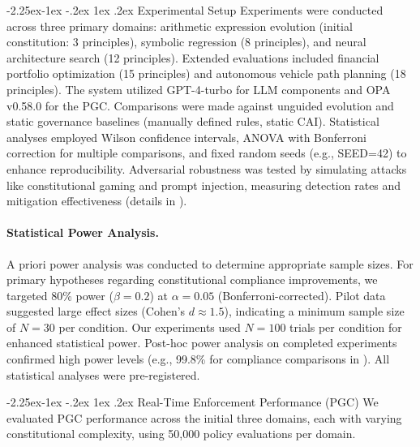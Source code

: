 \documentclass[manuscript,screen,review,anonymous,9pt]{acmart}
\makeatletter
\renewcommand\subsection{\@startsection{subsection}{2}{\z@}%
  {-2.25ex\@plus -1ex \@minus -.2ex}%
  {1ex \@plus .2ex}%
  {\normalfont\large\bfseries}}
\makeatother
\begin{document}
\subsection{Experimental Setup}
\label{subsec:experimental_setup}
Experiments were conducted across three primary domains: arithmetic expression evolution (initial constitution: 3 principles), symbolic regression (8 principles), and neural architecture search (12 principles). Extended evaluations included financial portfolio optimization (15 principles) and autonomous vehicle path planning (18 principles). The system utilized GPT-4-turbo for LLM components and OPA v0.58.0 for the PGC. Comparisons were made against unguided evolution and static governance baselines (manually defined rules, static CAI). Statistical analyses employed Wilson confidence intervals, ANOVA with Bonferroni correction for multiple comparisons, and fixed random seeds (e.g., SEED=42) to enhance reproducibility. Adversarial robustness was tested by simulating attacks like constitutional gaming and prompt injection, measuring detection rates and mitigation effectiveness (details in ).

\paragraph{Statistical Power Analysis.}
\label{subsec:power_analysis}
A priori power analysis was conducted to determine appropriate sample sizes. For primary hypotheses regarding constitutional compliance improvements, we targeted 80\% power ($\beta = 0.2$) at $\alpha = 0.05$ (Bonferroni-corrected). Pilot data suggested large effect sizes (Cohen's $d \approx 1.5$), indicating a minimum sample size of $N=30$ per condition. Our experiments used $N=100$ trials per condition for enhanced statistical power. Post-hoc power analysis on completed experiments confirmed high power levels (e.g., 99.8\% for compliance comparisons in ). All statistical analyses were pre-registered.

\subsection{Real-Time Enforcement Performance (PGC)}
\label{subsec:pgc_performance}
We evaluated PGC performance across the initial three domains, each with varying constitutional complexity, using 50,000 policy evaluations per domain.
\end{document}

